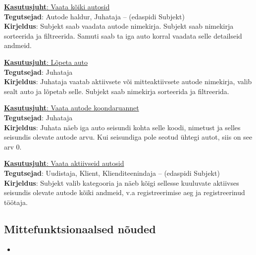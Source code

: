 \begin{flushleft}
	\underline{\textbf{Kasutusjuht}: Vaata kõiki autosid} \\
	\textbf{Tegutsejad}: Autode haldur, Juhataja – (edaspidi Subjekt) \\
	\textbf{Kirjeldus}: Subjekt saab vaadata autode nimekirja. Subjekt saab nimekirja sorteerida ja filtreerida. Samuti saab ta iga auto korral vaadata selle detailseid andmeid. 
\end{flushleft}

\begin{flushleft}
	\underline{\textbf{Kasutusjuht}: Lõpeta auto} \\
	\textbf{Tegutsejad}: Juhataja \\
	\textbf{Kirjeldus}: Juhataja vaatab aktiivsete või mitteaktiivsete autode nimekirja, valib sealt auto ja lõpetab selle. Subjekt saab nimekirja sorteerida ja filtreerida. 
\end{flushleft}

\begin{flushleft}
	\underline{\textbf{Kasutusjuht}: Vaata autode koondaruannet} \\
	\textbf{Tegutsejad}: Juhataja \\
	\textbf{Kirjeldus}: Juhata näeb iga auto seisundi kohta selle koodi, nimetust ja selles seisundis olevate autode arvu. Kui seisundiga pole seotud ühtegi autot, siis on see arv 0. 
\end{flushleft}

\begin{flushleft}
	\underline{\textbf{Kasutusjuht}: Vaata aktiivseid autosid} \\
	\textbf{Tegutsejad}: Uudistaja, Klient, Klienditeenindaja – (edaspidi Subjekt) \\
	\textbf{Kirjeldus}: Subjekt valib kategooria ja näeb kõigi sellesse kuuluvate aktiivses seisundis olevate autode kõiki andmeid, v.a registreerimise aeg ja registreerinud töötaja. 
\end{flushleft}

\subsection{Mittefunktsionaalsed nõuded}
\begin{itemize}
	\item 
\end{itemize}